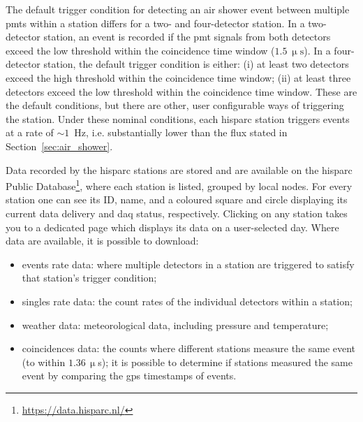 The default trigger condition for detecting an air shower event between multiple \glspl{pmt} within a station differs for a two- and four-detector station. In a two-detector station, an event is recorded if the \gls{pmt} signals from both detectors exceed the low threshold within the coincidence time window ($1.5~\upmu\mathrm{s}$). In a four-detector station, the default trigger condition is either: (i) at least two detectors exceed the high threshold within the coincidence time window; (ii) at least three detectors exceed the low threshold within the coincidence time window. These are the default conditions, but there are other, user configurable ways of triggering the station. Under these nominal conditions, each \gls{hisparc} station triggers events at a rate of $\sim1$~Hz, i.e. substantially lower than the flux stated in Section~\ref{sec:air_shower}.




Data recorded by the \gls{hisparc} stations are stored and are available on the \gls{hisparc} Public Database\footnote{\url{https://data.hisparc.nl/}}, where each station is listed, grouped by local nodes. For every station one can see its ID, name, and a coloured square and circle displaying its current data delivery and \gls{daq} status, respectively. Clicking on any station takes you to a dedicated page which displays its data on a user-selected day. Where data are available, it is possible to download: %
%
\begin{itemize}
	\item{events rate data: where multiple detectors in a station are triggered to satisfy that station's trigger condition;}
	\item{singles rate data: the count rates of the individual detectors within a station;}
	\item{weather data: meteorological data, including pressure and temperature;}
	\item{coincidences data: the counts where different stations measure the same event (to within $1.36 \, \upmu$s); it is possible to determine if stations measured the same event by comparing the \gls{gps} timestamps of events.}
\end{itemize}

